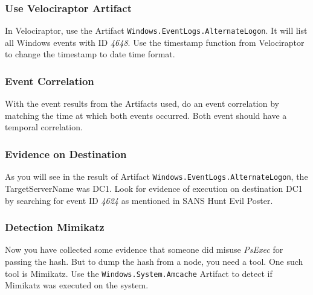 \subsubsection{Use Velociraptor Artifact}
In Velociraptor, use the Artifact \lstinline|Windows.EventLogs.AlternateLogon|. It will list all Windows events with ID \textit{4648}. Use the timestamp function from Velociraptor to change the timestamp to date time format.

\subsubsection{Event Correlation}
With the event results from the Artifacts used, do an event correlation by matching the time at which both events occurred. Both event should have a temporal correlation.

\subsubsection{Evidence on Destination}
As you will see in the result of Artifact \lstinline|Windows.EventLogs.AlternateLogon|, the TargetServerName was DC1. Look for evidence of execution on destination DC1 by searching for event ID \textit{4624} as mentioned in SANS Hunt Evil Poster.

\subsubsection{Detection Mimikatz}
Now you have collected some evidence that someone did misuse \textit{PsExec} for passing the hash. But to dump the hash from a node, you need a tool. One such tool is Mimikatz. Use the \lstinline|Windows.System.Amcache| Artifact to detect if Mimikatz was executed on the system.